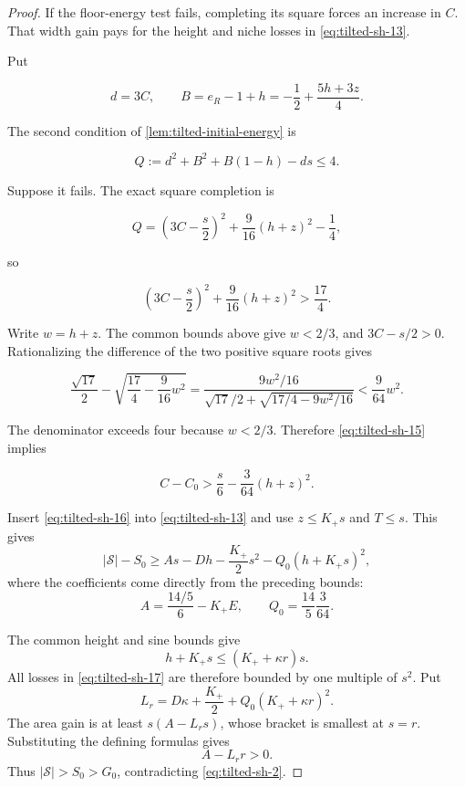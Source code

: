 \begin{proof}
If the floor-energy test fails, completing its square forces an
increase in $C$. That width gain pays for the height and niche losses
in \eqref{eq:tilted-sh-13}.

Put

\[
d=3C,\qquad B=e_R-1+h=-\frac12+\frac{5h+3z}{4}.
\]

The second condition of \cref{lem:tilted-initial-energy} is

\[
Q:=d^2+B^2+B(1-h)-ds\le4.
\]

Suppose it fails. The exact square completion is

\[
Q=\left(3C-\frac s2\right)^2
+\frac9{16}(h+z)^2-\frac14,
\]

so

\begin{equation}\label{eq:tilted-sh-15}
\left(3C-\frac s2\right)^2
+\frac9{16}(h+z)^2>\frac{17}{4}.
\end{equation}

Write \(w=h+z\). The common bounds above give \(w<2/3\), and
\(3C-s/2>0\). Rationalizing the difference of the two positive
square roots gives

\[
\frac{\sqrt{17}}2-
\sqrt{\frac{17}{4}-\frac9{16}w^2}
=\frac{9w^2/16}{\sqrt{17}/2+
\sqrt{17/4-9w^2/16}}
<\frac9{64}w^2.
\]

The denominator exceeds four because \(w<2/3\). Therefore \eqref{eq:tilted-sh-15}
implies

\begin{equation}\label{eq:tilted-sh-16}
C-C_0>\frac s6-\frac3{64}(h+z)^2.
\end{equation}

Insert \eqref{eq:tilted-sh-16} into \eqref{eq:tilted-sh-13}
and use $z\le K_+s$ and $T\le s$. This gives
\begin{equation}\label{eq:tilted-sh-17}
 |\mathcal S|-S_0\ge
 As-Dh-\frac{K_+}{2}s^2-Q_0\left(h+K_+s\right)^2,
\end{equation}
where the coefficients come directly from the preceding bounds:
\[
 A=\frac{14/5}{6}-K_+E,\qquad
 Q_0=\frac{14}{5}\frac3{64}.
\]

The common height and sine bounds give
\[
h+K_+s\le\left(K_++\kappa r\right)s.
\]
All losses in \eqref{eq:tilted-sh-17} are therefore bounded by
one multiple of $s^2$. Put
\[
 L_r=D\kappa+\frac{K_+}{2}+
       Q_0\left(K_++\kappa r\right)^2.
\]
The area gain is at least $s(A-L_rs)$, whose bracket is smallest
at $s=r$. Substituting the defining formulas gives
\begin{equation}\label{eq:tilted-sh-18}
 A-L_rr>0.
\end{equation}
Thus $|\mathcal S|>S_0>G_0$, contradicting
\eqref{eq:tilted-sh-2}.


\end{proof}
